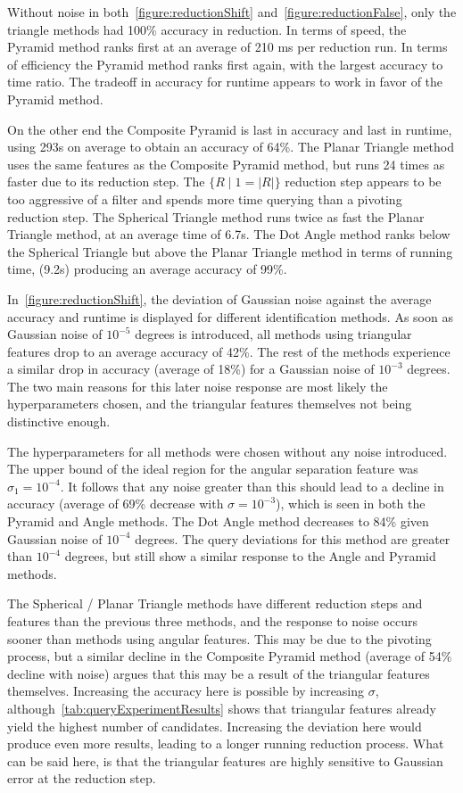 Without noise in both~\autoref{figure:reductionShift} and~\autoref{figure:reductionFalse}, only the triangle methods
had 100\% accuracy in reduction.
In terms of speed, the Pyramid method ranks first at an average of 210 ms per reduction run.
In terms of efficiency the Pyramid method ranks first again, with the largest accuracy to time ratio.
The tradeoff in accuracy for runtime appears to work in favor of the Pyramid method.

On the other end the Composite Pyramid is last in accuracy and last in runtime, using 293s on average to obtain an
accuracy of 64\%.
The Planar Triangle method uses the same features as the Composite Pyramid method, but runs 24 times as faster due to
its reduction step.
The $\{ R \mid 1 = |R| \}$ reduction step appears to be too aggressive of a filter and spends more time querying than
a pivoting reduction step.
The Spherical Triangle method runs twice as fast the Planar Triangle method, at an average time of 6.7s.
The Dot Angle method ranks below the Spherical Triangle but above the Planar Triangle method in terms of running time,
(9.2s) producing an average accuracy of 99\%.

In~\autoref{figure:reductionShift}, the deviation of Gaussian noise against the average accuracy and runtime is
displayed for different identification methods.
As soon as Gaussian noise of $10^{-5}$ degrees is introduced, all methods using triangular features drop to an average
accuracy of 42\%.
The rest of the methods experience a similar drop in accuracy (average of 18\%) for a Gaussian noise of $10^{-3}$
degrees.
The two main reasons for this later noise response are most likely the hyperparameters chosen, and the triangular
features themselves not being distinctive enough.

The hyperparameters for all methods were chosen without any noise introduced.
The upper bound of the ideal region for the angular separation feature was $\sigma_1 = 10^{-4}$.
It follows that any noise greater than this should lead to a decline in accuracy (average of 69\% decrease with
$\sigma = 10^{-3}$), which is seen in both the Pyramid and Angle methods.
The Dot Angle method decreases to 84\% given Gaussian noise of $10^{-4}$ degrees.
The query deviations for this method are greater than $10^{-4}$ degrees, but still show a similar response to the Angle
and Pyramid methods.

The Spherical / Planar Triangle methods have different reduction steps and features than the previous three methods,
and the response to noise occurs sooner than methods using angular features.
This may be due to the pivoting process, but a similar decline in the Composite Pyramid method (average of 54\%
decline with noise) argues that this may be a result of the triangular features themselves.
Increasing the accuracy here is possible by increasing $\sigma$, although~\autoref{tab:queryExperimentResults} shows
that triangular features already yield the highest number of candidates.
Increasing the deviation here would produce even more results, leading to a longer running reduction process.
What can be said here, is that the triangular features are highly sensitive to Gaussian error at the reduction step.

